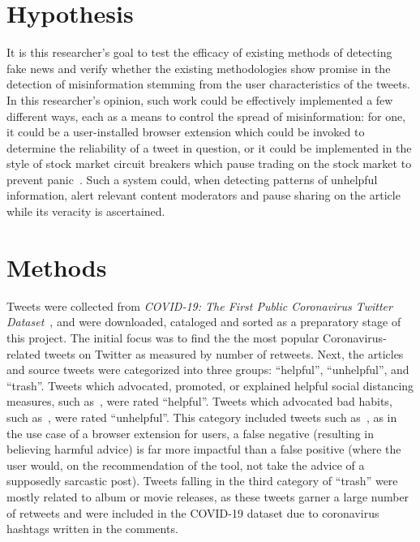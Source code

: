 \documentclass[conference]{IEEEtran}
\begin{document}
\section{Hypothesis}

It is this researcher's goal to test the efficacy of existing
methods of detecting fake news and verify whether the existing
methodologies show promise in the detection of misinformation
stemming from the user characteristics of the tweets. In this
researcher's opinion, such work could be effectively implemented
a few different ways, each as a means to control the spread of
misinformation: for one, it could be a user-installed browser
extension which could be invoked to determine the reliability of
a tweet in question, or it could be implemented in the style of
stock market circuit breakers which pause trading on the stock
market to prevent panic~\cite{stockcircuitbreakers}. Such a
system could, when detecting patterns of unhelpful information,
alert relevant content moderators and pause sharing on the
article while its veracity is ascertained.

\section{Methods}

Tweets were collected from \textit{COVID-19: The First Public
	Coronavirus Twitter Dataset}~\cite{dataset}, and were downloaded,
cataloged and sorted as a preparatory stage of this project. The
initial focus was to find the the most popular
Coronavirus-related tweets on Twitter as measured by number of
retweets.  Next, the articles and source tweets were categorized
into three groups: ``helpful'', ``unhelpful'', and ``trash''.
Tweets which advocated, promoted, or explained helpful social
distancing measures, such as~\cite{goodolebarack}, were rated
``helpful''.  Tweets which advocated bad habits, such
as~\cite{dangeroustweeter}, were rated ``unhelpful''. This
category included tweets such as~\cite{sarcastictweet}, as in the
use case of a browser extension for users, a false negative
(resulting in believing harmful advice) is far more impactful
than a false positive (where the user would, on the
recommendation of the tool, not take the advice of a supposedly
sarcastic post). Tweets falling in the third category of
``trash'' were mostly related to album or movie releases, as
these tweets garner a large number of retweets and were included
in the COVID-19 dataset due to coronavirus hashtags written in
the comments.
\end{document}
